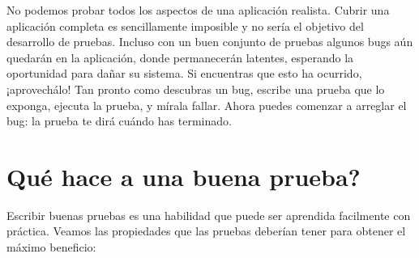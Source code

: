 \documentclass[a4paper,10pt,twoside]{book}
\begin{document}

No podemos probar todos los aspectos de una aplicaci\'on realista.
Cubrir una aplicaci\'on completa es sencillamente imposible y no ser\'ia el objetivo del desarrollo de pruebas.
Incluso con un buen conjunto de pruebas
algunos bugs a\'un quedar\'an en la aplicaci\'on, donde permanecer\'an latentes, esperando la oportunidad para da\~nar su sistema.
Si encuentras que esto ha ocurrido, ¡aprovech\'alo!
Tan pronto como descubras un bug, escribe una prueba que lo exponga, ejecuta la prueba, y m\'irala fallar.
Ahora puedes comenzar a arreglar el bug: la prueba te dir\'a cu\'ando has terminado.

\section{Qu\'e hace a una buena prueba?}

Escribir buenas pruebas es una habilidad que puede ser aprendida facilmente con pr\'actica.
Veamos las propiedades que las pruebas deber\'ian tener para obtener el m\'aximo beneficio: 
\end{document}

